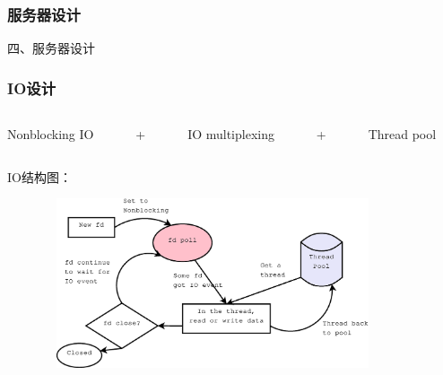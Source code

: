 \documentclass[10pt,dvipdfm]{beamer}
\begin{document}
\begin{frame}
	\frametitle{服务器设计}
	\begin{center}
	{\Large
		四、服务器设计
	}
	\end{center}
\end{frame}

\begin{frame}
	\frametitle{IO设计}
	\begin{columns}
		\begin{column}{0.25\textwidth}
			\begin{alertblock}{}
				Nonblocking IO
			\end{alertblock}
			
		\end{column}
		
		\begin{column}{0.02\textwidth}
			\begin{alertblock}{}
				+
			\end{alertblock}
		\end{column}
		
		\begin{column}{0.28\textwidth}
			\begin{alertblock}{}
				IO multiplexing
			\end{alertblock}
			
		\end{column}
		
		\begin{column}{0.02\textwidth}
			\begin{alertblock}{}
				+
			\end{alertblock}
		\end{column}
		
		\begin{column}{0.22\textwidth}
			\begin{alertblock}{}
				Thread pool
			\end{alertblock}
		\end{column}
	\end{columns}
	\pause
	\begin{block}{IO结构图：}
	\begin{figure}[htbp]
	\centering
	\includegraphics[height=5cm, width=10cm]{pics/IO.eps}
	\end{figure}
	\end{block}
	
\end{frame}
\end{document}
